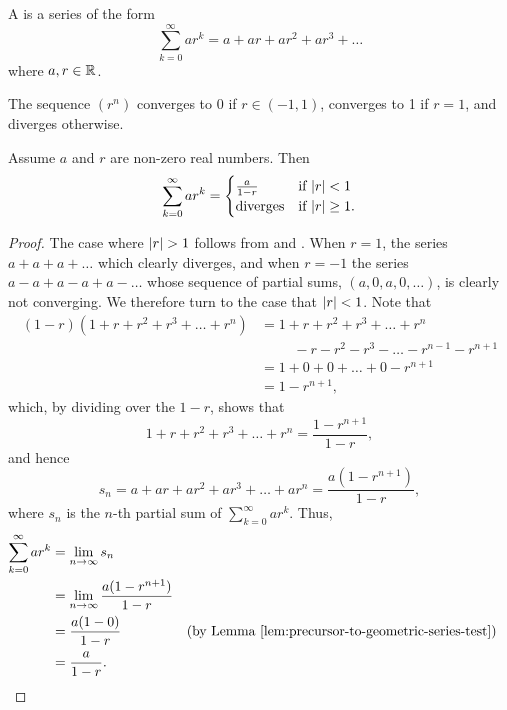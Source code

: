 \begin{definition}
  A  is a series of the form
  \[ \sum_{k = 0}^{\infty} ar^k = a + ar + ar^2 + ar^3 + \dots \]
  where $a, r \in \mathbb R$.
\end{definition}

\begin{lemma}
  The sequence $(r^n)$ converges to 0 if $r \in (-1, 1)$, converges
  to 1 if $r = 1$, and diverges otherwise.
\end{lemma}

\begin{proposition}
  Assume $a$ and $r$ are non-zero real numbers. Then
  \begin{align*}
    \sum_{k = 0}^{\infty} ar^k =
    \begin{cases}
      \frac{a}{1 - r} & \text{if $| r | < 1$} \\
      \text{diverges} & \text{if $| r | \geq 1$}.
    \end{cases}
  \end{align*}
\end{proposition}

\begin{proof}
  The case where $| r | > 1$ follows from
   and
  . When $r = 1$, the
  series $a + a + a + \dots$ which clearly diverges, and when $r =
  -1$ the series $a - a + a - a + a - \dots$ whose sequence of
  partial sums, $(a, 0, a, 0, \dots)$, is clearly not converging. We
  therefore turn to the case that $| r | < 1$. Note that
  \begin{align*}
    (1 - r) (1 + r + r^2 + r^3 + \dots + r^n) & = 1 + r + r^2 + r^3 +
    \dots + r^n \\
    & \phantom{=} \:\:\:\:\, - r - r^2 - r^3 - \dots - r^{n - 1} -
    r^{n + 1} \\
    & = 1 + 0 + 0 + \dots + 0 - r^{n + 1} \\
    & = 1 - r^{n + 1},
  \end{align*}
  which, by dividing over the $1 - r$, shows that
  \[ 1 + r + r^2 + r^3 + \dots + r^n = \frac{1 - r^{n + 1}}{1 - r}, \]
  and hence
  \[ s_n = a + ar + ar^2 + ar^3 + \dots + ar^n = \frac{a(1 - r^{n +
  1})}{1 - r}, \]
  where $s_n$ is the $n$-th partial sum of $\sum_{k = 0}^{\infty} ar^k$. Thus,
  \begin{align*}
    \sum_{k = 0}^{\infty} ar^k & = \lim_{n \to \infty} s_n \\
    & = \lim_{n \to \infty} \frac{a(1 - r^{n + 1})}{1 - r} \\
    & = \frac{a(1 - 0)}{1 - r} && \text{(by
    \lemref{precursor-to-geometric-series-test})} \\
    & = \frac{a}{1 - r}.
  \end{align*}
\end{proof}

